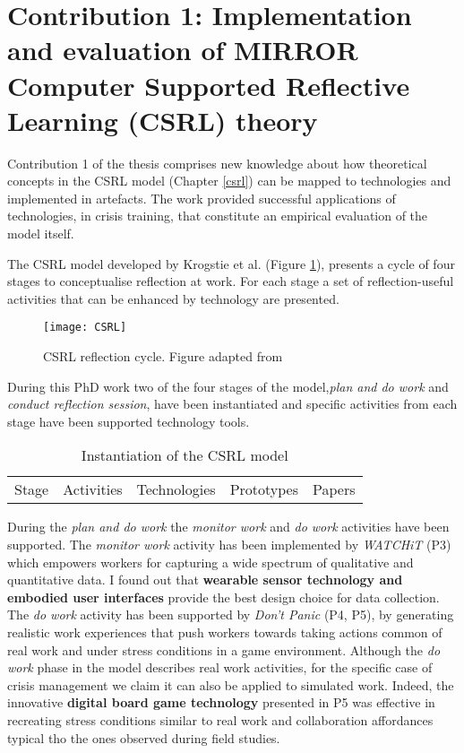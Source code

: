 \section{Contribution 1: Implementation and evaluation of MIRROR Computer Supported Reflective Learning (CSRL) theory}\label{c1-implementation-and-evaluation-of-mirror-computer-supported-reflective-learning-csrl-theory}

Contribution 1 of the thesis comprises new knowledge about how theoretical concepts in the CSRL model (Chapter \ref{csrl}) can be mapped to technologies and implemented in artefacts. The work provided successful applications of technologies, in crisis training, that constitute an empirical evaluation of the model itself.

The CSRL model developed by Krogstie et al. \autocite*{Krogstie:2013kf} (Figure \ref{fig:csrl-model-contrib}), presents a cycle of four stages to conceptualise reflection at work. For each stage a set of reflection-useful activities that can be enhanced by technology are presented. 

\begin{figure}
	[tbh] \centering 
	\texttt{[image: CSRL]} \caption{CSRL reflection cycle. Figure adapted from \protect\autocite{Krogstie:2013kf}} \label{fig:csrl-model-contrib} 
\end{figure}

During this PhD work two of the four stages of the model,\emph{plan and do work} and \emph{conduct reflection session}, have been instantiated and specific activities from each stage have been supported technology tools. 

\begin{table}[tbh] 
	\centering 
	\caption{Instantiation of the CSRL model} 
	\label{tab:model-instantiation} 
	\smallskip
	\begin{tabular}{@{}lcccc@{}}
	\toprule
	Stage & Activities & Technologies & Prototypes & Papers
	\bottomrule 
	\end{tabular}
\end{table}

During the \emph{plan and do work} the \emph{monitor work} and \emph{do work} activities have been supported. The \emph{monitor work} activity has been implemented by \emph{WATCHiT} (P3) which empowers workers for capturing a wide spectrum of qualitative and quantitative data. I found out that \textbf{wearable sensor technology and embodied user interfaces} provide the best design choice for data collection. The \emph{do work} activity has been supported by \emph{Don't Panic} (P4, P5), by generating realistic work experiences that push workers towards taking actions common of real work and under stress conditions in a game environment. Although the \emph{do work} phase in the model describes real work activities, for the specific case of crisis management we claim it can also be applied to simulated work. Indeed, the innovative \textbf{digital board game technology} presented in P5 was effective in recreating stress conditions similar to real work and collaboration affordances typical tho the ones observed during field studies.

